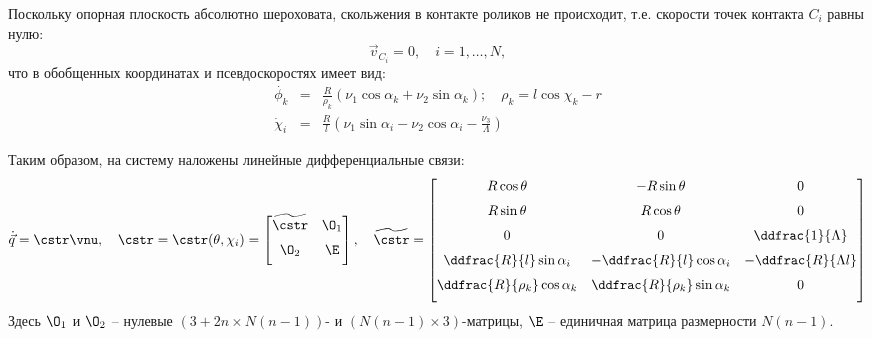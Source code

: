 Поскольку опорная плоскость абсолютно шероховата, скольжения в контакте роликов не происходит, т.е.
скорости точек контакта $C_i$ равны нулю:
\begin{equation}\label{eq:constraints_vec}
    \vec{v}_{C_i} = 0,\quad i = 1,\dots, N,
\end{equation}
что в обобщенных координатах и псевдоскоростях имеет вид:
\begin{eqnarray}
\dot{\phi_k} &=& \frac{R}{\rho_k }(\nu_1\cos\alpha_k + \nu_2\sin\alpha_k); \quad \rho_k  = l\cos\chi_k - r \label{constraint_roller_contact}\\
\dot{\chi}_i &=& \frac{R}{l}(\nu_1\sin\alpha_i - \nu_2\cos\alpha_i - \frac{\nu_3}{\Lambda})\label{constraint_wheel_contact}
\end{eqnarray}

Таким образом, на систему наложены линейные дифференциальные связи:
\begin{equation}\label{constraints_V}
    \dot{\vec{q}} = \cstr\vnu,\quad \cstr = \cstr(\theta,\chi_i) = \begin{bmatrix}
        \widetilde{\cstr}  & \O_1  \\[6pt]
        \O_2       & \E         \\[6pt]
    \end{bmatrix},
    \quad
    \widetilde{\cstr} = \begin{bmatrix}
        R\cos\theta                    & -R\sin\theta                    & 0                      \\[6pt]
        R\sin\theta                    &  R\cos\theta                    & 0                      \\[6pt]
        0                              & 0                               & \ddfrac{1}{\Lambda}    \\[6pt]
        \ddfrac{R}{l}\sin\alpha_i      & -\ddfrac{R}{l}\cos\alpha_i      & -\ddfrac{R}{\Lambda l} \\[6pt]
        \ddfrac{R}{\rho_k}\cos\alpha_k &  \ddfrac{R}{\rho_k}\sin\alpha_k & 0                      \\[6pt]
    \end{bmatrix}
\end{equation}
Здесь $\O_1$ и $\O_2$ -- нулевые $(3+2n \times N(n-1))$- и $(N(n-1) \times 3)$-матрицы, $\E$ -- единичная матрица размерности $N(n-1)$.

